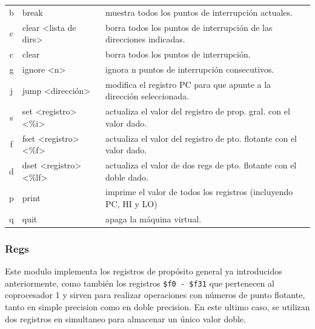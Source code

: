 \documentclass[12pt]{article}
\begin{document}
\begin{table}[H]
\begin{tabular}{@{}cll@{}}
b                         & break                                                        & muestra todos los puntos de interrupción actuales.                            \\
c                         & clear \textless lista de dirs\textgreater              & borra todos los puntos de interrupción de las direcciones indicadas.          \\
c                         & clear                                                        & borra todos los puntos de interrupción.                                       \\
g                         & ignore \textless n\textgreater                                & ignora n puntos de interrupción consecutivos.                                 \\
j                         & jump \textless dirección\textgreater                          & modifica el registro PC para que apunte a la dirección seleccionada.          \\
s                         & set \textless registro\textgreater \textless\%i\textgreater   & actualiza el valor del registro de prop. gral. con el valor dado.             \\
f                         & fset \textless registro\textgreater \textless\%f\textgreater  & actualiza el valor del registro de pto. flotante con el valor dado.           \\
d                         & dset \textless registro\textgreater \textless\%lf\textgreater & actualiza el valor de dos regs de pto. flotante con el doble dado. \\
p                         & print                                                        & imprime el valor de todos los registros (incluyendo PC, HI y LO)              \\
q                         & quit                                                         & apaga la máquina virtual.                                                    
\end{tabular}
\end{table}

\subsubsection{Regs}

Este modulo implementa los registros de propósito general ya introducidos anteriormente, como también los registros \texttt{\$f0 - \$f31} que pertenecen al coprocesador 1 y sirven para realizar operaciones con números de punto flotante, tanto en simple precision como en doble precision. En este ultimo caso, se utilizan dos registros en simultaneo para almacenar un único valor doble.
\end{document}
